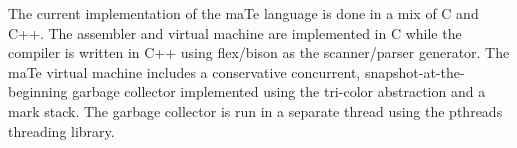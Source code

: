 The current implementation of the maTe language is done in a mix of C
and C++.  The assembler and virtual machine are implemented in C while
the compiler is written in C++ using flex/bison as the scanner/parser
generator.  The maTe virtual machine includes a conservative
concurrent, snapshot-at-the-beginning garbage collector implemented
using the tri-color abstraction and a mark stack.  The garbage
collector is run in a separate thread using the pthreads threading
library.

